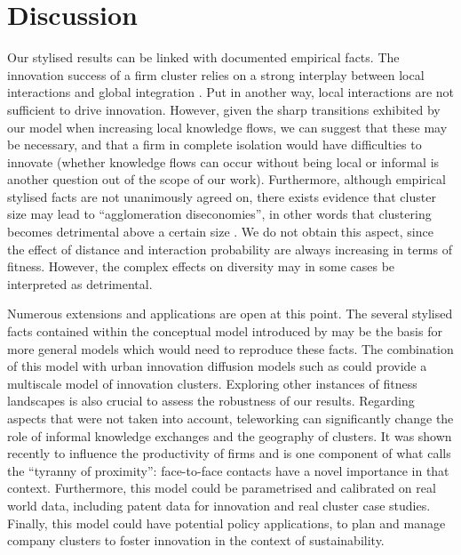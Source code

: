 \documentclass[letterpaper]{article}
\begin{document}
\section{Discussion}



Our stylised results can be linked with documented empirical facts. The innovation success of a firm cluster relies on a strong interplay between local interactions and global integration \citep{fitjar2014local}. Put in another way, local interactions are not sufficient to drive innovation. However, given the sharp transitions exhibited by our model when increasing local knowledge flows, we can suggest that these may be necessary, and that a firm in complete isolation would have difficulties to innovate (whether knowledge flows can occur without being local or informal is another question out of the scope of our work). Furthermore, although empirical stylised facts are not unanimously agreed on, there exists evidence that cluster size may lead to ``agglomeration diseconomies'', in other words that clustering becomes detrimental above a certain size \cite{folta2006geographic}. We do not obtain this aspect, since the effect of distance and interaction probability are always increasing in terms of fitness. However, the complex effects on diversity may in some cases be interpreted as detrimental.

Numerous extensions and applications are open at this point. The several stylised facts contained within the conceptual model introduced by \cite{gnyawali2013complementary} may be the basis for more general models which would need to reproduce these facts. The combination of this model with urban innovation diffusion models such as \cite{raimbault2020model} could provide a multiscale model of innovation clusters. Exploring other instances of fitness landscapes is also crucial to assess the robustness of our results. Regarding aspects that were not taken into account, teleworking can significantly change the role of informal knowledge exchanges and the geography of clusters. It was shown recently to influence the productivity of firms \citep{bergeaud4015066telework} and is one component of what \cite{duranton1999distance} calls the ``tyranny of proximity'': face-to-face contacts have a novel importance in that context. Furthermore, this model could be parametrised and calibrated on real world data, including patent data for innovation and real cluster case studies. Finally, this model could have potential policy applications, to plan and manage company clusters to foster innovation in the context of sustainability.
\end{document}
